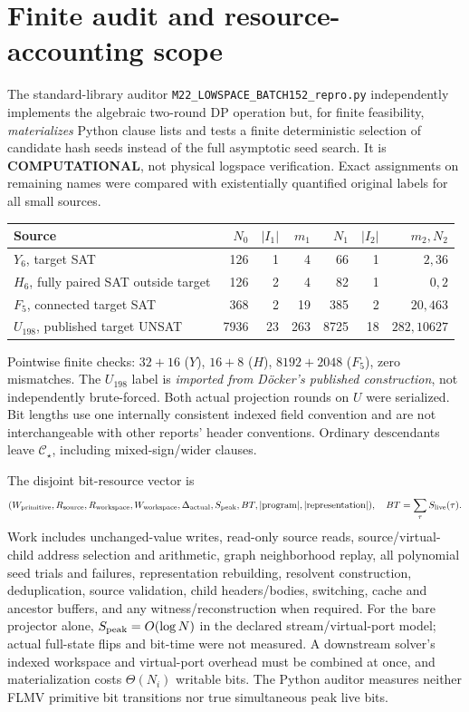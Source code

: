 \documentclass[11pt]{article}
\newcommand{\CS}{\mathcal C_\star}
\begin{document}
\section{Finite audit and resource-accounting scope}
The standard-library auditor \texttt{M22\_LOWSPACE\_BATCH152\_repro.py} independently implements the algebraic two-round DP operation but, for finite feasibility, \emph{materializes} Python clause lists and tests a finite deterministic selection of candidate hash seeds instead of the full asymptotic seed search. It is \textbf{COMPUTATIONAL}, not physical logspace verification. Exact assignments on remaining names were compared with existentially quantified original labels for all small sources.
\begin{center}\small\begin{tabular}{lrrrrrr}
\toprule
Source & $N_0$ & $|I_1|$ & $m_1$ & $N_1$ & $|I_2|$ & $m_2,N_2$\\\midrule
$Y_6$, target SAT & 126&1&4&66&1&$2,36$\\
$H_6$, fully paired SAT outside target&126&2&4&82&1&$0,2$\\
$F_5$, connected target SAT&368&2&19&385&2&$20,463$\\
$U_{198}$, published target UNSAT&7936&23&263&8725&18&$282,10627$\\
\bottomrule
\end{tabular}\end{center}
Pointwise finite checks: $32+16$ ($Y$), $16+8$ ($H$), $8192+2048$ ($F_5$), zero mismatches. The $U_{198}$ label is \emph{imported from D\"ocker's published construction}, not independently brute-forced. Both actual projection rounds on $U$ were serialized. Bit lengths use one internally consistent indexed field convention and are not interchangeable with other reports' header conventions. Ordinary descendants leave $\CS$, including mixed-sign/wider clauses.

The disjoint bit-resource vector is
\[
(W_{\rm primitive},R_{\rm source},R_{\rm workspace},W_{\rm workspace},
\Delta_{\rm actual},S_{\rm peak},BT,|\mathrm{program}|,|\mathrm{representation}|),
\quad BT=\sum_\tau S_{\rm live}(\tau).
\]
Work includes unchanged-value writes, read-only source reads, source/virtual-child address selection and arithmetic, graph neighborhood replay, all polynomial seed trials and failures, representation rebuilding, resolvent construction, deduplication, source validation, child headers/bodies, switching, cache and ancestor buffers, and any witness/reconstruction when required. For the bare projector alone, $S_{\rm peak}=O(\log N)$ in the declared stream/virtual-port model; actual full-state flips and bit-time were not measured. A downstream solver's indexed workspace and virtual-port overhead must be combined at once, and materialization costs $\Theta(N_i)$ writable bits. The Python auditor measures neither FLMV primitive bit transitions nor true simultaneous peak live bits.
\end{document}
